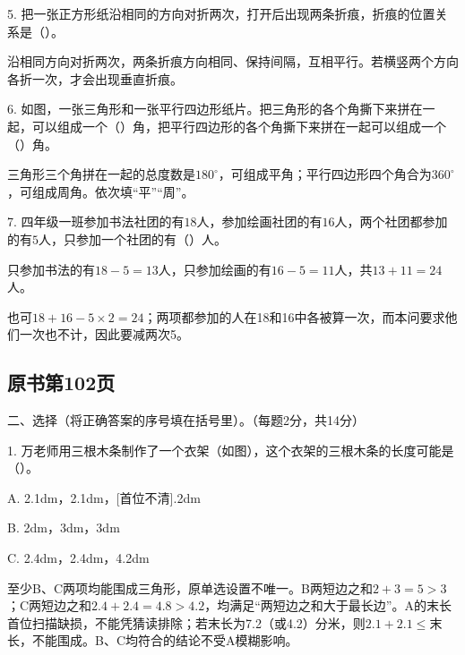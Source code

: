 5. 把一张正方形纸沿相同的方向对折两次，打开后出现两条折痕，折痕的位置关系是（\hspace{1.8em}）。\par
\begin{BookAnswer}
沿相同方向对折两次，两条折痕方向相同、保持间隔，互相平行。若横竖两个方向各折一次，才会出现垂直折痕。
\end{BookAnswer}

6. 如图，一张三角形和一张平行四边形纸片。把三角形的各个角撕下来拼在一起，可以组成一个（\hspace{1.8em}）角，把平行四边形的各个角撕下来拼在一起可以组成一个（\hspace{1.8em}）角。\par
{}
\begin{BookAnswer}
三角形三个角拼在一起的总度数是\(180^\circ\)，可组成平角；平行四边形四个角合为\(360^\circ\)，可组成周角。依次填“平”“周”。
\end{BookAnswer}

7. 四年级一班参加书法社团的有\(18\)人，参加绘画社团的有\(16\)人，两个社团都参加的有\(5\)人，只参加一个社团的有（\hspace{1.8em}）人。\par
\begin{BookAnswer}
只参加书法的有\(18-5=13\)人，只参加绘画的有\(16-5=11\)人，共\(13+11=24\)人。\par 也可\(18+16-5\times2=24\)；两项都参加的人在18和16中各被算一次，而本问要求他们一次也不计，因此要减两次5。
\end{BookAnswer}



\subsection*{原书第102页}

二、选择（将正确答案的序号填在括号里）。（每题2分，共14分）\par 1. 万老师用三根木条制作了一个衣架（如图），这个衣架的三根木条的长度可能是（\hspace{1.8em}）。\par
\noindent A. 2.1dm，2.1dm，[首位不清].2dm\par
\noindent B. 2dm，3dm，3dm\par
\noindent C. 2.4dm，2.4dm，4.2dm\par
{}
\begin{BookAnswer}
至少B、C两项均能围成三角形，原单选设置不唯一。B两短边之和\(2+3=5>3\)；C两短边之和\(2.4+2.4=4.8>4.2\)，均满足“两短边之和大于最长边”。A的末长首位扫描缺损，不能凭猜读排除；若末长为7.2（或4.2）分米，则\(2.1+2.1\le\)末长，不能围成。B、C均符合的结论不受A模糊影响。
\end{BookAnswer}

